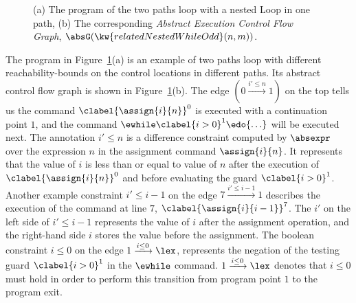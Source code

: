 \begin{example}
{\begin{figure}
\begin{subfigure}{.5\textwidth}
\begin{centering}
  \caption{}
    \end{centering}
    \end{subfigure}
  \caption{
  (a) The program of the two paths loop with a nested Loop in one path,
    (b) The corresponding \emph{Abstract Execution Control Flow Graph}, $\absG(\kw{relatedNestedWhileOdd}(n, m))$. }
      \label{fig:relatedNestedWhileOdd_abscfg}
  \end{figure}
  }
The program in Figure~\ref{fig:relatedNestedWhileOdd_abscfg}(a) is an example of two paths loop with different reachability-bounds on the control
locations in different paths.
Its abstract control flow graph is shown in Figure~\ref{fig:relatedNestedWhileOdd_abscfg}(b).
The edge $(0 \xrightarrow{i' \leq n} 1)$ on the top tells us the command 
$\clabel{\assign{i}{n}}^0$ is executed with a continuation point $1$, and the
command $\ewhile \clabel{i > 0}^1 \edo \{\ldots\}$ will be executed next.
The annotation $i' \leq n$ is a difference constraint 
computed by $\absexpr$ over
the expression $n$ in the assignment command $\assign{i}{n}$.
It represents that the value of $i$ is less than or equal to value of $n$ after the
execution of $\clabel{\assign{i}{n}}^0$ and before evaluating the guard $\clabel{i > 0}^1$.
Another example constraint $i' \leq i - 1$ on the edge $7 \xrightarrow{i' \leq i - 1} 1$
describes the execution of
 the command at line $7$, 
$\clabel{\assign{i}{i - 1}}^{7}$. 
The $i'$ on the left side of $i' \leq i - 1$ represents the value of $i$ after the assignment operation,
and the right-hand side $i$ stores the value before the assignment.
The boolean constraint $i \leq 0 $ on the edge $1 \xrightarrow{i \leq 0} \lex$, 
represents the negation of the testing guard $\clabel{i > 0}^1$
in the $\ewhile$ command.
$1 \xrightarrow{i \leq 0} \lex$ denotes that $i \leq 0$ must hold in order to perform this transition from program point $1$ to
the program exit. 
  \end{example}    
  